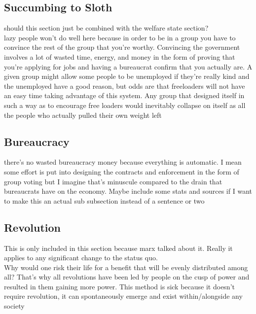 \documentclass{article}[10pt]
\begin{document}
\subsection{Succumbing to Sloth}
should this section just be combined with the welfare state section?\\
lazy people won’t do well here because in order to be in a group you have to convince the rest of the group that you’re worthy. 
Convincing the government involves a lot of wasted time, energy, and money in the form of proving that you’re applying for jobs and having a bureaucrat confirm that you actually are. 
A given group might allow some people to be unemployed if they’re really kind and the unemployed have a good reason, but odds are that freeloaders will not have an easy time taking advantage of this system. 
Any group that designed itself in such a way as to encourage free loaders would inevitably collapse on itself as all the people who actually pulled their own weight left

\subsection{Bureaucracy}
there’s no wasted bureaucracy money because everything is automatic. 
I mean some effort is put into designing the contracts and enforcement in the form of group voting but I imagine that’s minuscule compared to the drain that bureaucrats have on the economy. 
Maybe include some stats and sources if I want to make this an actual sub subsection instead of a sentence or two

\subsection{Revolution}
This is only included in this section because marx talked about it. Really it applies to any significant change to the status quo. \\
Why would one risk their life for a benefit that will be evenly distributed among all? 
That's why all revolutions have been led by people on the cusp of power and resulted in them gaining more power. 
This method is sick because it doesn't require revolution, it can spontaneously emerge and exist within/alongside any society
\end{document}
